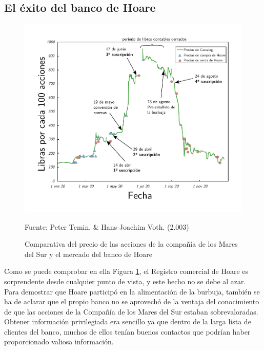 \subsection{El éxito del banco de Hoare}
\begin{figure}[h!]
	\caption{Comparativa del precio de las acciones de la compañía de los Mares del Sur y el mercado del banco de Hoare}
	\centering
	\includegraphics[width=150mm]{capitulos/graficos/bancoHoare}
	\label{fig:bancoHoare}

	\footnotesize
	Fuente: Peter Temin, \& Hans-Joachim Voth. (2.003)

\end{figure}

Como se puede comprobar en ella Figura \ref{fig:bancoHoare}, el Registro comercial de Hoare es sorprendente desde cualquier punto de vista, y este hecho no se debe al azar. Para demostrar que Hoare participó en la alimentación de la burbuja, también se ha de aclarar que el propio banco no se aprovechó de la ventaja del conocimiento de que las acciones de la Compañía de los Mares del Sur estaban sobrevaloradas. Obtener información privilegiada era sencillo ya que dentro de la larga lista de clientes del banco, muchos de ellos tenían buenos contactos que podrían haber proporcionado valiosa información.

